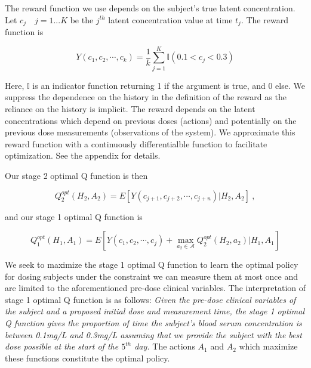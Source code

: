 The reward function we use depends on the subject’s true latent concentration. Let $ c_j \quad j=1...K $ be the $ j^{th}$ latent concentration value at time $ t_j $.  The reward function is 

\begin{equation}
Y(c_1, c_2, \cdots, c_k) = \dfrac{1}{k}\sum_{j=1}^K \mathbb{I}(0.1 < c_j < 0.3)
\end{equation}

\noindent Here, $ \mathbb{I} $ is an indicator function returning 1 if the argument is true, and 0 else.  
%
We suppress the dependence on the history in the definition of the reward as the reliance on the history is implicit.  The reward depends on the latent concentrations which depend on previous doses (actions) and potentially on the previous dose measurements (observations of the system).  We approximate this reward function with a continuously differentialble function to facilitate optimization.  See the appendix for details.  

Our stage 2 optimal Q function is then

\begin{equation}
Q_{2}^{o p t}\left(H_{2}, A_{2}\right)=E\left[Y\left(c_{j+1}, c_{j+2}, \cdots, c_{j+n}\right) \Bigg\vert H_{2}, A_{2}\right] \>,
\end{equation}

\noindent and our stage 1 optimal Q function is

\begin{equation}
Q_{1}^{o p t}\left(H_{1}, A_{1}\right)= E \left[Y\left(c_{1}, c_{2}, \cdots, c_{j}\right)+\max _{a_{2} \in \mathscr{A}} Q_{2}^{o p t}\left(H_{2}, a_{2}\right) \Bigg\vert H_{1}, A_{1}\right]
\end{equation}

We seek to maximize the stage 1 optimal Q function to learn the optimal policy for dosing subjects under the constraint we can measure them at most once and are limited to the aforementioned pre-dose clinical variables.  The interpretation of stage 1 optimal Q function is as follows:\textit{ Given the pre-dose clinical variables of the subject and a proposed initial dose and measurement time, the stage 1 optimal Q function gives the proportion of time the subject’s blood serum concentration is between 0.1mg/L and 0.3mg/L assuming that we provide the subject with the best dose possible at the start of the $ 5^{th} $ day.}  The actions $ A_1 $ and $ A_2 $ which maximize these functions constitute the optimal policy.

